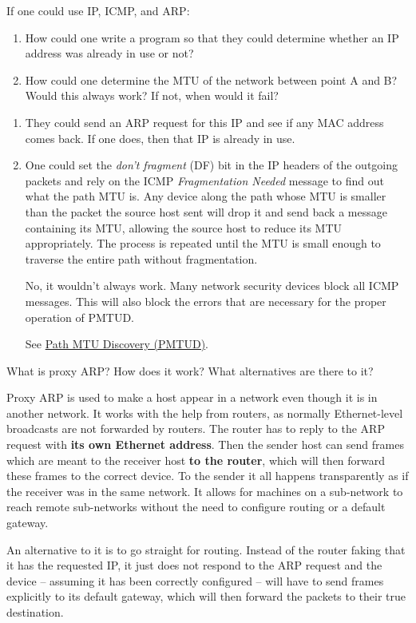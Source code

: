 \begin{Exercise}
If one could use IP, ICMP, and ARP:
\begin{enumerate}
    \item How could one write a program so that they could determine whether an IP address was already in use or not?
    \item How could one determine the MTU of the network between point A and B?
    Would this always work? If not, when would it fail?
\end{enumerate}
\end{Exercise}
\begin{Answer}
\begin{enumerate}
    \item They could send an ARP request for this IP and see if any MAC address comes back.
    If one does, then that IP is already in use.
    \item One could set the \textit{don't fragment} (DF) bit in the IP headers of the outgoing packets and rely on the ICMP \textit{Fragmentation Needed} message to find out what the path MTU is. Any device along the path whose MTU is smaller than the packet the source host sent will drop it and send back a message containing its MTU, allowing the source host to reduce its MTU appropriately. The process is repeated until the MTU is small enough to traverse the entire path without fragmentation.

    No, it wouldn't always work. Many network security devices block all ICMP messages. This will also block the errors that are necessary for the proper operation of PMTUD.

    See \href{https://en.wikipedia.org/wiki/Path_MTU_Discovery}{Path MTU Discovery (PMTUD)}.
\end{enumerate}
\end{Answer}

\begin{Exercise}
What is proxy ARP? How does it work? What alternatives are there to it?
\end{Exercise}
\begin{Answer}
Proxy ARP is used to make a host appear in a network even though it is in another network.
It works with the help from routers, as normally Ethernet-level broadcasts are not forwarded by routers.
The router has to reply to the ARP request with \textbf{its own Ethernet address}.
Then the sender host can send frames which are meant to the receiver host \textbf{to the router}, which will then forward these frames to the correct device.
To the sender it all happens transparently as if the receiver was in the same network.
It allows for machines on a sub-network to reach remote sub-networks without the need to configure routing or a default gateway.

An alternative to it is to go straight for routing. Instead of the router faking that it has the requested IP, it just does not respond to the ARP request and the device -- assuming it has been correctly configured -- will have to send frames explicitly to its default gateway, which will then forward the packets to their true destination.
\end{Answer}

